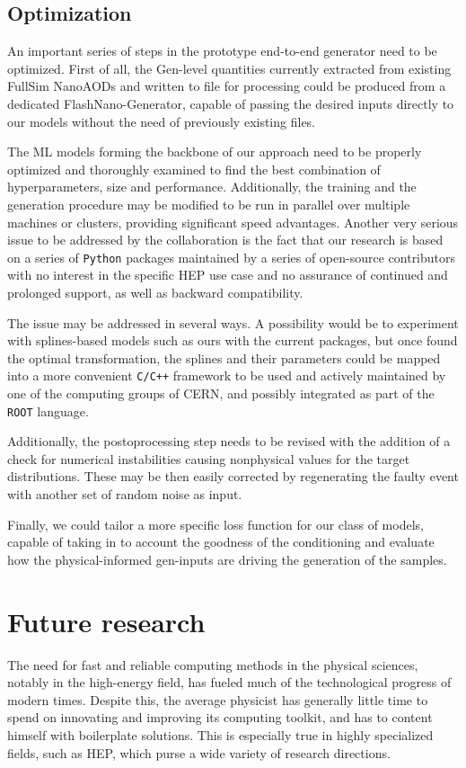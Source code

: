 \subsection{Optimization}
An important series of steps in the prototype end-to-end generator need to be optimized. 
First of all, the Gen-level quantities currently extracted from existing FullSim NanoAODs and written to file for processing could be produced from a dedicated FlashNano-Generator, capable of passing the desired inputs directly to our models without the need of previously existing files.

The ML models forming the backbone of our approach need to be properly optimized and thoroughly examined to find the best combination of hyperparameters, size and performance. Additionally, the training and the generation procedure may be modified to be run in parallel over multiple machines or clusters, providing significant speed advantages. Another very serious issue to be addressed by the collaboration is the fact that our research is based on a series of \texttt{Python} packages maintained by a series of open-source contributors with no interest in the specific HEP use case and no assurance of continued and prolonged support, as well as backward compatibility.

The issue may be addressed in several ways. A possibility would be to experiment with splines-based models such as ours with the current packages, but once found the optimal transformation, the splines and their parameters could be mapped into a more convenient \texttt{C/C++} framework to be used and actively maintained by one of the computing groups of CERN, and possibly integrated as part of the \texttt{ROOT} language.

Additionally, the postoprocessing step needs to be revised with the addition of a check for numerical instabilities causing nonphysical values for the target distributions. These may be then easily corrected by regenerating the faulty event with another set of random noise as input.

Finally, we could tailor a more specific loss function for our class of models, capable of taking in to account the goodness of the conditioning and evaluate how the physical-informed gen-inputs are driving the generation of the samples.

\section{Future research}
The need for fast and reliable computing methods in the physical sciences, notably in the high-energy field, has fueled much of the technological progress of modern times. Despite this, the average physicist has generally little time to spend on innovating and improving its computing toolkit, and has to content himself with boilerplate solutions. This is especially true in highly specialized fields, such as HEP, which purse a wide variety of research directions.


